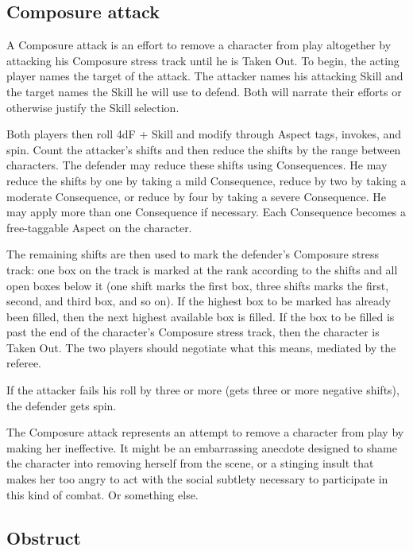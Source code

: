 \subsection{Composure attack}\label{sec:Composure attack}

A Composure attack is an effort to remove a character from play altogether by attacking his Composure stress track until he is Taken Out. To begin, the acting player names the target of the attack. The attacker names his attacking Skill and the target names the Skill he will use to defend. Both will narrate their efforts or otherwise justify the Skill selection.

Both players then roll 4dF + Skill and modify through Aspect tags, invokes, and spin. Count the attacker's shifts and then reduce the shifts by the range between characters. The defender may reduce these shifts using Consequences. He may reduce the shifts by one by taking a mild Consequence, reduce by two by taking a moderate Consequence, or reduce by four by taking a severe Consequence. He may apply more than one Consequence if necessary. Each Consequence becomes a free-taggable Aspect on the character.

The remaining shifts are then used to mark the defender's Composure stress track: one box on the track is marked at the rank according to the shifts and all open boxes below it (one shift marks the first box, three shifts marks the first, second, and third box, and so on). If the highest box to be marked has already been filled, then the next highest available box is filled. If the box to be filled is past the end of the character's Composure stress track, then the character is Taken Out. The two players should negotiate what this means, mediated by the referee.

If the attacker fails his roll by three or more (gets three or more negative shifts), the defender gets spin.

The Composure attack represents an attempt to remove a character from play by making her ineffective. It might be an embarrassing anecdote designed to shame the character into removing herself from the scene, or a stinging insult that makes her too angry to act with the social subtlety necessary to participate in this kind of combat. Or something else.

\subsection{Obstruct}\label{sec:Obstruct}

